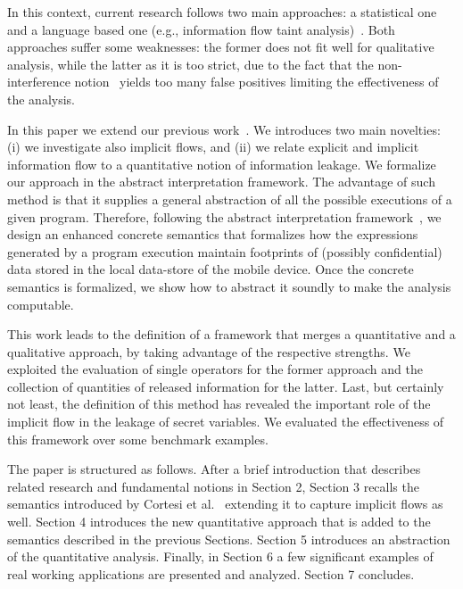 \documentclass{llncs}
\begin{document}
In this context, current research follows two main approaches: a statistical one~\cite{Lowe02,McCamant06,McCamant08} and a language based one (e.g., information flow taint analysis)~\cite{Arzt14,HS09,SG07,Sridharan11,Tripp14,Tripp09}. Both approaches suffer some weaknesses: the former does not fit well for qualitative analysis, while the latter as it is too strict, due to the fact that the non-interference notion~\cite{DD76} yields too many false positives limiting the effectiveness of the analysis. 

In this paper we extend our previous work~\cite{Cortesi15}. We introduces two main novelties: (i) we investigate also implicit flows, and (ii) we relate explicit and implicit information flow to a quantitative notion of information leakage. We formalize our approach in the abstract interpretation framework. The advantage of such method is that it supplies a general abstraction of all the possible executions of a given program. Therefore, following the abstract interpretation framework~\cite{CousotCousot77-1}, we design an enhanced concrete semantics that formalizes how the expressions generated by a program execution maintain footprints of (possibly confidential) data stored in the local data-store of the mobile device. Once the concrete semantics is formalized, we show how to abstract it soundly to make the analysis computable.

This work leads to the definition of a framework that merges a quantitative and a qualitative approach, by taking advantage of the respective strengths. We exploited the evaluation of single operators for the former approach and the collection of quantities of released information for the latter. Last, but certainly not least, the definition of this method has revealed the important role of the implicit flow in the leakage of secret variables. We evaluated the effectiveness of this framework over some benchmark examples.

The paper is structured as follows. After a brief introduction that describes related research and fundamental notions in Section 2, Section 3 recalls the semantics introduced by Cortesi et al.~\cite{Cortesi15} extending it to capture  implicit flows as well. Section 4 introduces the new quantitative approach that is added to the semantics described in the previous Sections.  Section 5 introduces an abstraction of the quantitative analysis.  Finally, in Section 6 a few significant examples of real working applications are presented and analyzed. Section 7 concludes.
\end{document}
